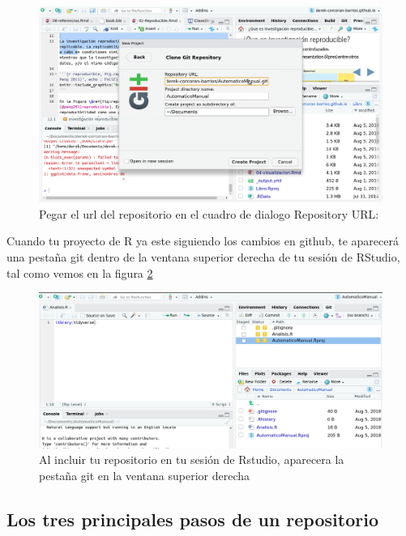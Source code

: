 \documentclass[]{book}
\begin{document}
\begin{figure}

{\centering \includegraphics[width=0.8\linewidth]{GitRstudio} 

}

\caption{Pegar el url del repositorio en el cuadro de dialogo Repository URL:}\label{fig:GitRstudio}
\end{figure}

Cuando tu proyecto de R ya este siguiendo los cambios en github, te
aparecerá una pestaña git dentro de la ventana superior derecha de tu
sesión de RStudio, tal como vemos en la figura \ref{fig:GitPan}

\begin{figure}

{\centering \includegraphics[width=0.8\linewidth]{GitPan} 

}

\caption{Al incluir tu repositorio en tu sesión de Rstudio, aparecera la pestaña git en la ventana superior derecha}\label{fig:GitPan}
\end{figure}

\hypertarget{los-tres-principales-pasos-de-un-repositorio}{%
\subsection{Los tres principales pasos de un
repositorio}\label{los-tres-principales-pasos-de-un-repositorio}}
\end{document}
